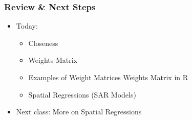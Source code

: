\documentclass[
  shownotes,
  xcolor={svgnames},
  hyperref={colorlinks,citecolor=DarkBlue,linkcolor=DarkRed,urlcolor=DarkBlue}
   , aspectratio=169]{beamer}
\begin{document}
\begin{frame}

\frametitle{Review \& Next Steps}
  
  \begin{itemize} 
    \item Today:
    \medskip
    \begin{itemize} 
        \item Closeness
        \medskip
        \item Weights Matrix
        \medskip
        \item Examples of Weight Matrices Weights Matrix in R
        \medskip
        \item  Spatial Regressions (SAR Models)
      \end{itemize}
    \bigskip  

  \item  Next class: More on Spatial Regressions



\end{itemize}
\end{frame}

\end{document}
